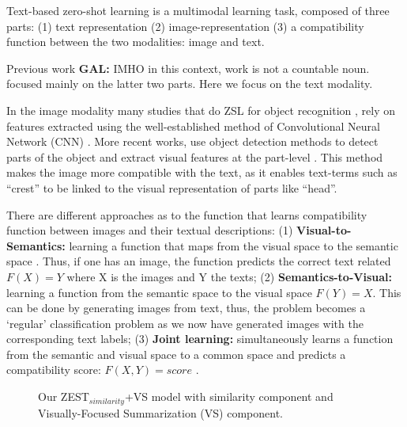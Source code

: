 \documentclass[11pt,a4paper]{article}
\newcommand\gal[1]{\textcolor{bright}{\textbf{GAL:} #1 }}
\begin{document}
Text-based zero-shot learning is a multimodal learning task, composed of three parts: (1) text representation (2) image-representation (3) a compatibility function between the two modalities: image and text. \par

Previous work \gal{IMHO in this context, work is not a countable noun.} focused mainly on the latter two parts. Here we focus on the text modality. \par

In the image modality many studies that do ZSL for object recognition \cite{xu2018attngan,lei2015predicting,qiao2016less,akata2016multi}, rely on features extracted using the well-established method of
Convolutional Neural Network (CNN) \cite{lecun1995convolutional}. More recent works, use object detection methods to detect parts of the object and extract visual features at the part-level \cite{elhoseiny2017link,zhu2018generative,zhang2016spda}. This
method makes the image more compatible with the text, as it enables text-terms such as \enquote{crest} to be linked to the visual representation of parts like \enquote{head}. \par



There are different approaches as to the function that learns compatibility function between images and their textual descriptions: (1) \textbf{Visual-to-Semantics:} learning a function that maps from the visual space to the semantic space \citep{socher2013zero}. Thus, if one has an image, the function predicts the correct text related $F(X)=Y$ where X is the images and Y the texts; (2) \textbf{Semantics-to-Visual:} learning a function from the semantic space to the visual space \citet{zhu2018generative} $F(Y)=X$. This can be done by generating images from text, thus, the problem becomes a \enquote*{regular} classification problem as we now have generated images with the corresponding text labels; (3) \textbf{Joint learning:} simultaneously learns a function from the semantic and visual space to a common space and predicts a compatibility score: $F(X,Y)=score$  \cite{akata2015evaluation,akata2016multi,qiao2016less,elhoseiny2013write,elhoseiny2016write}.\par



\begin{figure}[t]
\centering
{}
 \caption{Our ZEST$_{similarity}$+VS model with similarity component and Visually-Focused Summarization (VS) component.}
\label{fig:data}
\end{figure}
\end{document}
